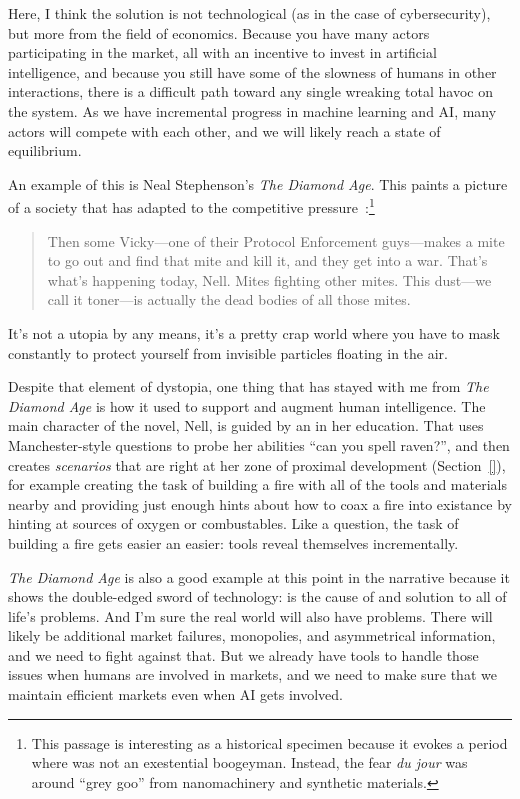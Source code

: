 Here, I think the solution is not technological (as in the case of
cybersecurity), but more from the field of economics. Because you have
many actors participating in the market, all with an incentive to
invest in artificial intelligence, and because you still have some of
the slowness of humans in other interactions, there is a difficult
path toward any single  wreaking total havoc on the system. As we
have incremental progress in machine learning and AI, many actors will
compete with each other, and we will likely reach a state of
equilibrium.

An example of this is Neal Stephenson's \textit{The Diamond Age}.
%
This paints a picture of a society that has adapted to the competitive
pressure~\cite{}:\footnote{This passage is interesting as a historical
  specimen because it evokes a period where  was not an
  exestential boogeyman.  Instead, the fear \textit{du jour} was
  around ``grey goo'' from nanomachinery and synthetic materials.}
\begin{quote}
  Then some Vicky—one of their Protocol
Enforcement guys—makes a mite to go out and find that mite and kill it,
and they get into a war. That's what's happening today, Nell. Mites fighting
other mites. This dust—we call it toner—is actually the dead bodies of all
those mites.
\end{quote}
It's not a utopia by any means, it's a pretty crap world where you
have to mask constantly to protect yourself from invisible particles
floating in the air.

Despite that element of dystopia, one thing that has stayed with me
from \textit{The Diamond Age} is how it used  to support and augment human intelligence.
%
The main character of the novel, Nell, is guided by an  in her education.
%
That  uses Manchester-style questions to probe her abilities
``can you spell raven?'', and then creates \emph{scenarios} that are
right at her zone of proximal development (Section~\ref{}), for
example creating the task of building a fire with all of the tools and
materials nearby and providing just enough hints about how to coax a
fire into existance by hinting at sources of oxygen or combustables.
%
Like a \quizbowl{} question, the task of building a fire gets easier
an easier: tools reveal themselves incrementally.


\textit{The Diamond Age} is also a good example at this point in the narrative because it shows the double-edged sword of technology:  is the cause of and solution to all of life's problems.
%
And I'm sure the real world will also have problems. There will likely
be additional market failures, monopolies, and asymmetrical
information, and we need to fight against that.
%
But we already have tools to handle
those issues when humans are involved in markets, and we need to make
sure that we maintain efficient markets even when AI gets involved.

